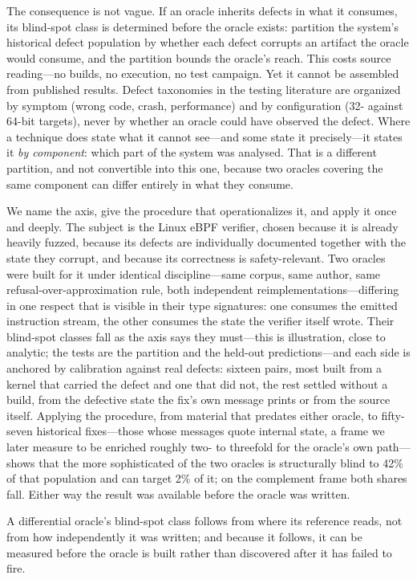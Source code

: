 The consequence is not vague. If an oracle inherits defects in what it consumes,
its blind-spot class is determined before the oracle exists: partition the system's
historical defect population by whether each defect corrupts an artifact the oracle
would consume, and the partition bounds the oracle's reach. This costs source
reading---no builds, no execution, no test campaign. Yet it cannot be assembled from
published results. Defect taxonomies in the testing literature are organized by
symptom (wrong code, crash, performance) and by configuration (32- against 64-bit
targets), never by whether an oracle could have observed the defect. Where a technique
does state what it cannot see---and some state it precisely---it states it \emph{by
component}: which part of the system was analysed. That is a different partition, and
not convertible into this one, because two oracles covering the same component can
differ entirely in what they consume.

We name the axis, give the procedure that operationalizes it, and apply it once and
deeply. The subject is the Linux eBPF verifier, chosen because it is already heavily
fuzzed, because its defects are individually documented together with the state they
corrupt, and because its correctness is safety-relevant. Two oracles were built for
it under identical discipline---same corpus, same author, same
refusal-over-approximation rule, both independent reimplementations---differing in
one respect that is visible in their type signatures: one consumes the emitted
instruction stream, the other consumes the state the verifier itself wrote. Their
blind-spot classes fall as the axis says they must---this is illustration, close to
analytic; the tests are the partition and the held-out predictions---and each side is anchored
by calibration against real defects: sixteen pairs, most built from a kernel that
carried the defect and one that did not, the rest settled without a build, from the
defective state the fix's own message prints or from the source itself. Applying the procedure, from material that predates either oracle, to
fifty-seven historical fixes---those whose messages quote internal state, a frame we
later measure to be enriched roughly two- to threefold for the oracle's own path---shows that
the more sophisticated of the two oracles is structurally blind to 42\% of that
population and can target 2\% of it; on the complement frame both shares fall.
Either way the result was available before the oracle was written.

A differential oracle's blind-spot class follows from where its reference reads, not
from how independently it was written; and because it follows, it can be measured
before the oracle is built rather than discovered after it has failed to fire.
